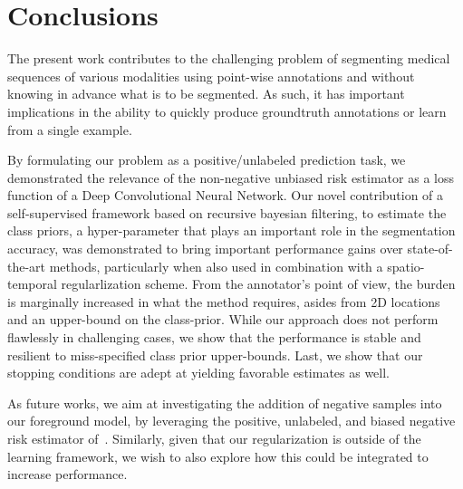 \section{Conclusions}
\label{sec:conclusion}

The present work contributes to the challenging problem of segmenting medical sequences of various modalities using point-wise annotations and without knowing in advance what is to be segmented. As such, it has important implications in the ability to quickly produce groundtruth annotations or learn from a single example.

By formulating our problem as a positive/unlabeled prediction task, we demonstrated the relevance of the non-negative unbiased risk estimator as a loss function of a Deep Convolutional Neural Network. Our novel contribution of a self-supervised framework based on recursive bayesian filtering, to estimate the class priors, a hyper-parameter that plays an important role in the segmentation accuracy, was demonstrated to bring important performance gains over state-of-the-art methods, particularly when also used in combination with a spatio-temporal regularlization scheme. From the annotator's point of view, the burden is marginally increased in what the method requires, asides from 2D locations and an upper-bound on the class-prior. While our approach does not perform flawlessly in challenging cases, we show that the performance is stable and resilient to miss-specified class prior upper-bounds. Last, we show that our stopping conditions are adept at yielding favorable estimates as well.

As future works, we aim at investigating the addition of negative samples into our foreground model, by leveraging the positive, unlabeled, and biased negative risk estimator of~\cite{hsieh19}. Similarly, given that our regularization is outside of the learning framework, we wish to also explore how this could be integrated to increase performance. 

